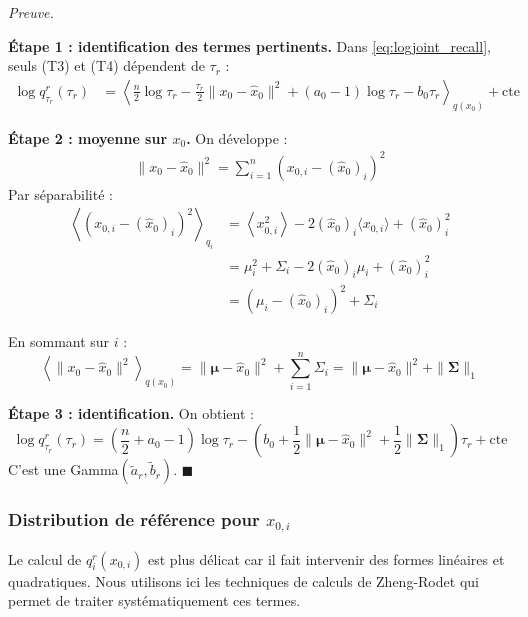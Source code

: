 \documentclass[12pt]{article}
\renewcommand{\qedsymbol}{$\blacksquare$}
\renewenvironment{proof}[1][\proofname]{%
  \par\medskip\noindent
  \textit{\color{proofgray}#1.}\enspace\ignorespaces
}{\hfill\qedsymbol\par\medskip}
\renewcommand{\proofname}{Preuve}
\begin{document}
\begin{proof}

\textbf{Étape 1 : identification des termes pertinents.} Dans \eqref{eq:logjoint_recall}, seuls (T3) et (T4) dépendent de $\tau_r$ :
\begin{align}
    \log q_{\tau_r}^r(\tau_r) &= \left\langle \frac{n}{2}\log\tau_r - \frac{\tau_r}{2}\|x_0 - \hat{x}_0\|^2 + (a_0-1)\log\tau_r - b_0\tau_r \right\rangle_{q(x_0)} + \mathrm{cte}
\end{align}

\textbf{Étape 2 : moyenne sur $x_0$.} On développe :
\begin{align}
    \|x_0 - \hat{x}_0\|^2 = \sum_{i=1}^n (x_{0,i} - (\hat{x}_0)_i)^2
\end{align}
Par séparabilité :
\begin{align}
    \left\langle (x_{0,i} - (\hat{x}_0)_i)^2 \right\rangle_{q_i} &= \left\langle x_{0,i}^2 \right\rangle - 2(\hat{x}_0)_i \langle x_{0,i} \rangle + (\hat{x}_0)_i^2 \nonumber\\[4pt]
    &= \mu_i^2 + \Sigma_i - 2(\hat{x}_0)_i \mu_i + (\hat{x}_0)_i^2 \nonumber\\[4pt]
    &= (\mu_i - (\hat{x}_0)_i)^2 + \Sigma_i
\end{align}

En sommant sur $i$ :
\begin{equation}
    \left\langle \|x_0 - \hat{x}_0\|^2 \right\rangle_{q(x_0)} = \|\boldsymbol{\mu} - \hat{x}_0\|^2 + \sum_{i=1}^n \Sigma_i = \|\boldsymbol{\mu} - \hat{x}_0\|^2 + \|\boldsymbol{\Sigma}\|_1
    \label{eq:expected_prior_residual}
\end{equation}

\textbf{Étape 3 : identification.} On obtient :
\[
\log q_{\tau_r}^r(\tau_r) = \left(\frac{n}{2} + a_0 - 1\right)\log\tau_r - \left(b_0 + \frac{1}{2}\|\boldsymbol{\mu} - \hat{x}_0\|^2 + \frac{1}{2}\|\boldsymbol{\Sigma}\|_1\right)\tau_r + \mathrm{cte}
\]
C'est une Gamma$(\tilde{a}_r, \tilde{b}_r)$.
\end{proof}


\subsubsection{Distribution de référence pour $x_{0,i}$}

Le calcul de $q_i^r(x_{0,i})$ est plus délicat car il fait intervenir des formes linéaires et quadratiques. Nous utilisons ici les techniques de calculs de Zheng-Rodet \cite{rodet} qui permet de traiter systématiquement ces termes.
\end{document}
